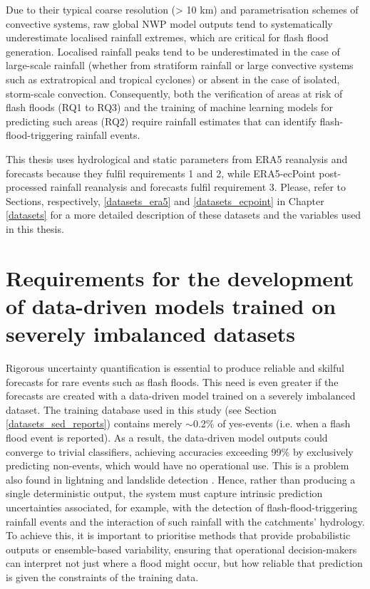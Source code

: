 Due  to their typical coarse resolution (> 10 km) and parametrisation schemes of convective systems, raw global NWP model outputs tend to systematically underestimate localised rainfall extremes, which are critical for flash flood generation. Localised rainfall peaks tend to be underestimated in the case of large-scale rainfall (whether from stratiform rainfall or large convective systems such as extratropical and tropical cyclones) or absent in the case of isolated, storm-scale convection. Consequently, both the verification of areas at risk of flash floods (RQ1 to RQ3) and the training of machine learning models for predicting such areas (RQ2) require rainfall estimates that can identify flash-flood-triggering rainfall events. 

This thesis uses hydrological and static parameters from ERA5 reanalysis and forecasts because they fulfil requirements 1 and 2, while ERA5-ecPoint post-processed rainfall reanalysis and forecasts fulfil requirement 3. Please, refer to Sections, respectively, \ref{datasets_era5} and \ref{datasets_ecpoint} in Chapter \ref{datasets} for a more detailed description of these datasets and the variables used in this thesis.


\section{Requirements for the development of data-driven models trained on severely imbalanced datasets}
\label{integrated_experimental_strategy_model_development_imbalanced_data}

Rigorous  uncertainty quantification is essential to produce reliable and skilful forecasts for rare events such as flash floods. This need is even greater if the forecasts are created with a data-driven model trained on a severely imbalanced dataset. The training database used in this study (see Section \ref{datasets_sed_reports}) contains merely $\sim$0.2\% of yes-events (i.e. when a flash flood event is reported). As a result, the data-driven model outputs could converge to trivial classifiers, achieving accuracies exceeding 99\% by exclusively predicting non-events, which would have no operational use. This is a problem also found in lightning \citep{Cavaiola_2024} and landslide detection \citep{Xu_2022, Agrawal_2017, Zhang_2022, Gupta_2023}. Hence, rather than producing a single deterministic output, the system must capture intrinsic prediction uncertainties associated, for example, with the detection of flash-flood-triggering rainfall events and the interaction of such rainfall with the catchments' hydrology. To achieve this, it is important to prioritise methods that provide probabilistic outputs or ensemble-based variability, ensuring that operational decision-makers can interpret not just where a flood might occur, but how reliable that prediction is given the constraints of the training data.

